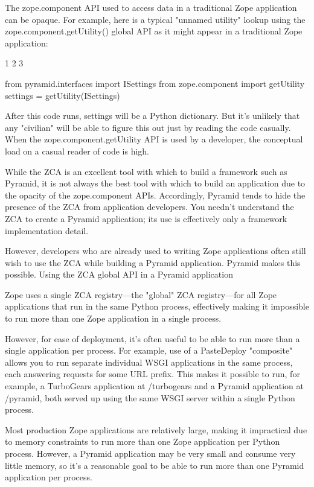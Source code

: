 \documentclass[a4paper,openany,twoside,final]{book}
\begin{document}
The zope.component API used to access data in a traditional Zope application can be opaque. For example, here is a typical "unnamed utility" lookup using the zope.component.getUtility() global API as it might appear in a traditional Zope application:

1
2
3



from pyramid.interfaces import ISettings
from zope.component import getUtility
settings = getUtility(ISettings)

After this code runs, settings will be a Python dictionary. But it's unlikely that any "civilian" will be able to figure this out just by reading the code casually. When the zope.component.getUtility API is used by a developer, the conceptual load on a casual reader of code is high.

While the ZCA is an excellent tool with which to build a framework such as Pyramid, it is not always the best tool with which to build an application due to the opacity of the zope.component APIs. Accordingly, Pyramid tends to hide the presence of the ZCA from application developers. You needn't understand the ZCA to create a Pyramid application; its use is effectively only a framework implementation detail.

However, developers who are already used to writing Zope applications often still wish to use the ZCA while building a Pyramid application. Pyramid makes this possible.
Using the ZCA global API in a Pyramid application

Zope uses a single ZCA registry—the "global" ZCA registry—for all Zope applications that run in the same Python process, effectively making it impossible to run more than one Zope application in a single process.

However, for ease of deployment, it's often useful to be able to run more than a single application per process. For example, use of a PasteDeploy "composite" allows you to run separate individual WSGI applications in the same process, each answering requests for some URL prefix. This makes it possible to run, for example, a TurboGears application at /turbogears and a Pyramid application at /pyramid, both served up using the same WSGI server within a single Python process.

Most production Zope applications are relatively large, making it impractical due to memory constraints to run more than one Zope application per Python process. However, a Pyramid application may be very small and consume very little memory, so it's a reasonable goal to be able to run more than one Pyramid application per process.
\end{document}
